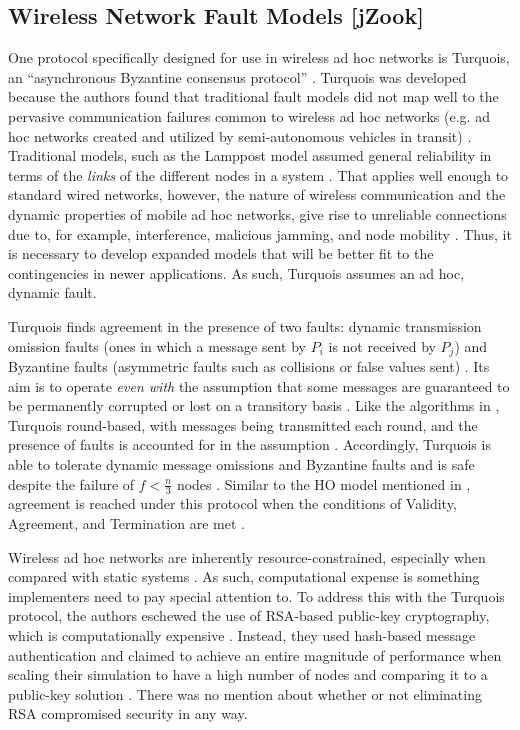 \documentclass[twoside, conference]{IEEEtran}
\begin{document}
\subsection{Wireless Network Fault Models [jZook]}


One protocol specifically designed for use in wireless ad hoc networks is Turquois, an ``asynchronous Byzantine consensus protocol'' \cite{moniz}. Turquois was developed because the authors found that traditional fault models did not map well to the pervasive communication failures common to wireless ad hoc networks (e.g. ad hoc networks created and utilized by semi-autonomous vehicles in transit) \cite{moniz}. Traditional models, such as the Lamppost model assumed general reliability in terms of the \textit{links} of the different nodes in a system \cite{moniz}. That applies well enough to standard wired networks, however, the nature of wireless communication and the dynamic properties of mobile ad hoc networks, give rise to unreliable connections due to, for example, interference, malicious jamming, and node mobility \cite{moniz}. Thus, it is necessary to develop expanded models that will be better fit to the contingencies in newer applications. As such, Turquois assumes an ad hoc, dynamic fault\cite{moniz}.

Turquois finds agreement in the presence of two faults: dynamic transmission omission faults (ones in which a message sent by $P_i$ is not received by $P_j$) and Byzantine faults (asymmetric faults such as collisions or false values sent) \cite{moniz}. Its aim is to operate \textit{even with} the assumption that some messages are guaranteed to be permanently corrupted or lost on a transitory basis \cite{moniz}. Like the algorithms in \cite{bialy}, Turquois round-based, with messages being transmitted each round, and the presence of faults is accounted for in the assumption \cite{moniz}. Accordingly, Turquois is able to tolerate dynamic message omissions and Byzantine faults and is safe despite the failure of $f < \frac{n}{3}$ nodes \cite{moniz}. Similar to the HO model mentioned in \cite{bialy}, agreement is reached under this protocol when the conditions of Validity, Agreement, and Termination are met \cite{moniz}.

Wireless ad hoc networks are inherently resource-constrained, especially when compared with static systems \cite{moniz}. As such, computational expense is something implementers need to pay special attention to. To address this with the Turquois protocol, the authors eschewed the use of RSA-based public-key cryptography, which is computationally expensive \cite{moniz}. Instead, they used hash-based message authentication and claimed to achieve an entire magnitude of performance when scaling their simulation to have a high number of nodes and comparing it to a public-key solution \cite{moniz}. There was no mention about whether or not eliminating RSA compromised security in any way.
\end{document}

